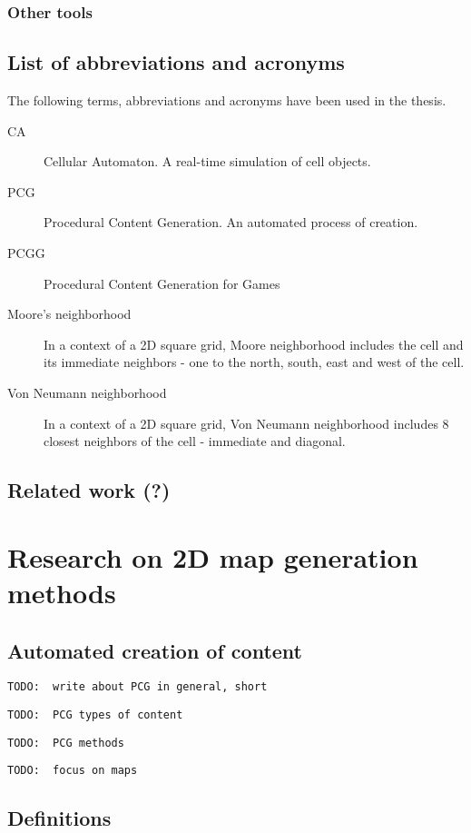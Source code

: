 \documentclass[12pt]{report}
\newcommand{\todo}[1]{}
\renewcommand{\todo}[1]{{\color{red} \par \noindent \footnotesize \texttt{TODO: {#1} }}}
\begin{document}
\subsection{Other tools }

 
\section{List of abbreviations and acronyms} 


The following terms, abbreviations and acronyms have been used in the thesis.

\begin{description}
	\item[CA] Cellular Automaton. A real-time simulation of cell objects.
	\item[PCG] Procedural Content Generation. An automated process of creation.
	\item[PCGG]	Procedural Content Generation for Games
	\item[Moore's neighborhood] In a context of a 2D square grid, Moore neighborhood includes the cell and its immediate neighbors - one to the north, south, east and west of the cell.
	\item[Von Neumann neighborhood] In a context of a 2D square grid, Von Neumann neighborhood includes 8 closest neighbors of the cell - immediate and diagonal.
\end{description}

\section{Related work (?)} 

\chapter{Research on 2D map generation methods} \label{rozdzial.teoria}

\section{ Automated creation of content}

\todo{ write about PCG in general, short }
\todo{ PCG types of content }
\todo{ PCG methods }
\todo{ focus on maps }

\section{Definitions} 
\end{document}
